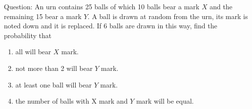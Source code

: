 \documentclass[journal,12pt,onecolumn]{IEEEtran}
\theoremstyle{remark}
\begin{document}
\let\vec\mathbf




\vspace{3cm}



\bigskip

\renewcommand{\thefigure}{\theenumi}
\renewcommand{\thetable}{\theenumi}
Question: An urn contains 25 balls of which 10 balls bear a mark $X$ and the remaining 15 bear a mark $Y$. A ball is drawn at random from the urn, its mark is noted down and it is replaced. If 6 balls are drawn in this way, find the probability that\\
\begin{enumerate}
\item all will bear $X$ mark.\\
\item not more than 2 will bear $Y$ mark.\\
\item at least one ball will bear $Y$ mark.\\
\item the number of balls with X mark and $Y$ mark will be equal.\\
\end{enumerate}
\solution  \\
\end{document}

